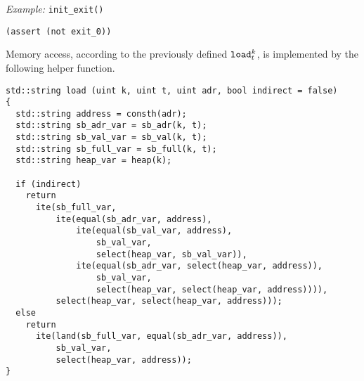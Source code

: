 \noindent
\emph{Example:} \lstinline[style=c++]{init_exit()}

\begin{lstlisting}[language=smtlib]
(assert (not exit_0))
\end{lstlisting}



\noindent
Memory access, according to the previously defined $\texttt{load}^k_t$, is implemented by the following helper function.

\begin{lstlisting}[style=c++]
std::string load (uint k, uint t, uint adr, bool indirect = false)
{
  std::string address = consth(adr);
  std::string sb_adr_var = sb_adr(k, t);
  std::string sb_val_var = sb_val(k, t);
  std::string sb_full_var = sb_full(k, t);
  std::string heap_var = heap(k);

  if (indirect)
    return
      ite(sb_full_var,
          ite(equal(sb_adr_var, address),
              ite(equal(sb_val_var, address),
                  sb_val_var,
                  select(heap_var, sb_val_var)),
              ite(equal(sb_adr_var, select(heap_var, address)),
                  sb_val_var,
                  select(heap_var, select(heap_var, address)))),
          select(heap_var, select(heap_var, address)));
  else
    return
      ite(land(sb_full_var, equal(sb_adr_var, address)),
          sb_val_var,
          select(heap_var, address));
}
\end{lstlisting}


